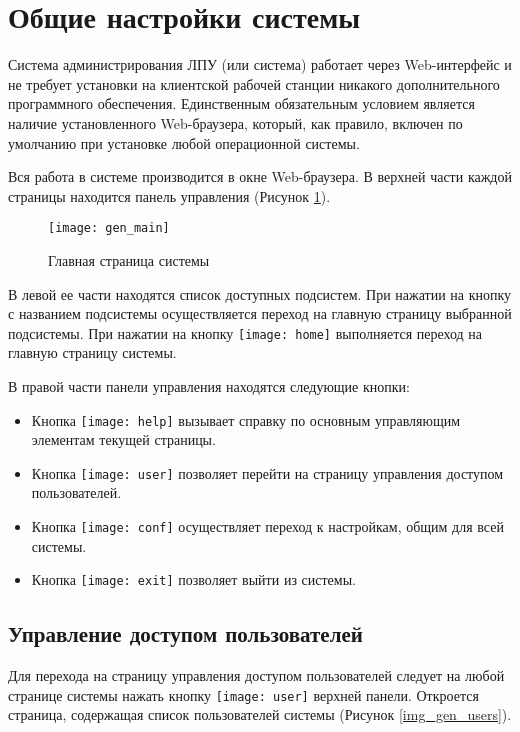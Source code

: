 \newpage
\section{Общие настройки системы}

Система администрирования ЛПУ (или система) работает через Web-интерфейс и не требует установки на клиентской рабочей станции никакого дополнительного программного обеспечения. Единственным обязательным условием является наличие установленного Web-браузера, который, как правило, включен по умолчанию при установке любой операционной системы.

Вся работа в системе производится в окне Web-браузера. В верхней части каждой страницы находится панель управления (Рисунок \ref{img_gen_main}).

\begin{figure}[ht]\centering
 \texttt{[image: gen\_main]}
 \caption{Главная страница системы}
 \label{img_gen_main}
\end{figure} 

В левой ее части находятся список доступных подсистем. При нажатии на кнопку с названием подсистемы осуществляется переход на главную страницу выбранной подсистемы. При нажатии на кнопку \texttt{[image: home]} выполняется переход на главную страницу системы.

В правой части панели управления находятся следующие кнопки:
\begin{itemize}
 \item Кнопка \texttt{[image: help]}  вызывает справку по основным управляющим элементам текущей страницы.
 \item Кнопка  \texttt{[image: user]} позволяет перейти на страницу управления доступом пользователей.
 \item Кнопка  \texttt{[image: conf]} осуществляет переход к настройкам, общим для всей системы.
 \item Кнопка \texttt{[image: exit]}  позволяет выйти из системы.
\end{itemize}
 
\subsection{Управление доступом пользователей}

Для перехода на страницу управления доступом пользователей следует на любой странице системы нажать кнопку \texttt{[image: user]} верхней панели. Откроется страница, содержащая список пользователей системы (Рисунок \ref{img_gen_users}).

